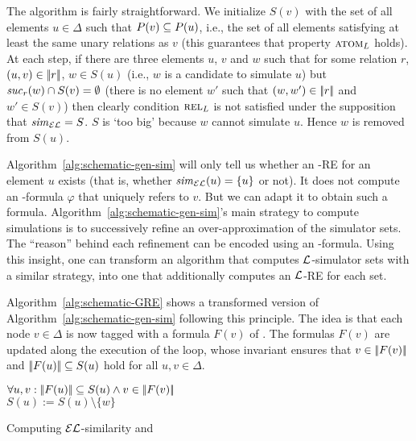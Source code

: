 %

The algorithm is fairly straightforward. We initialize $S(v)$ with
the set of all elements $u\in\Delta$ such that $P(v)\subseteq
P(u)$, i.e., the set of all elements satisfying at least the
same unary relations as $v$ (this guarantees that property $\textsc{atom}_L$ holds).
At each step, if there are three elements $u$, $v$ and $w$ such that
for some relation $r$, $(u,v) \in |\!|r|\!|$, $w\in S(u)$
(i.e., $w$ is a candidate to simulate $u$) but ${\it suc}_{r}(w)\cap S(v) = \emptyset$
(there is no element $w'$ such that $(w, w') \in |\!|r|\!|$
and $w'\in S(v)$) then clearly condition $\textsc{rel}_L$ is not satisfied
under the supposition that ${\it sim}_\mathcal{EL}=S$. $S$ is `too big' because
$w$ cannot simulate $u$. Hence $w$ is removed from $S(u)$.

Algorithm~\ref{alg:schematic-gen-sim} will only tell us
whether an \EL-RE for an element $u$ exists (that is,
whether ${\it sim}_{\mathcal{EL}}(u) = \{u\}$ or not).  It does not compute
an \EL-formula $\varphi$ that uniquely refers to $v$. But
we can adapt it to obtain such a formula.
Algorithm~\ref{alg:schematic-gen-sim}'s main strategy to compute simulations
is to successively
refine an over-approximation of the simulator sets.
The ``reason'' behind each refinement  can be encoded using an \EL-formula.
Using this insight, one can transform an algorithm that computes
$\mathcal{L}$-simulator sets with a similar strategy,  into one that additionally computes an $\mathcal{L}$-RE
for each set.


Algorithm~\ref{alg:schematic-GRE} shows a transformed version of
Algorithm~\ref{alg:schematic-gen-sim} following this principle. The
idea is that each node $v\in\Delta$ is now tagged with a formula
$F(v)$ of \EL. The formulas $F(v)$ are updated along the execution of
the loop, whose invariant  ensures that $v \in
|\!|F(v)|\!|$ and $|\!|F(u)|\!| \subseteq S(u)$ hold for all
$u,v\in\Delta$.

\begin{algorithm}\small
\io


\While{\guard}
{
  $\forall u,v: |\!|F(u)|\!| \subseteq S(u)\wedge v \in |\!|F(v)|\!|$\\
$S(u):=S(u)\setminus\{w\}$\;\label{alg:line:loop-body-begin}

} \caption{\small
Computing $\mathcal{EL}$-similarity and \posre}\label{alg:schematic-GRE}
\end{algorithm}

